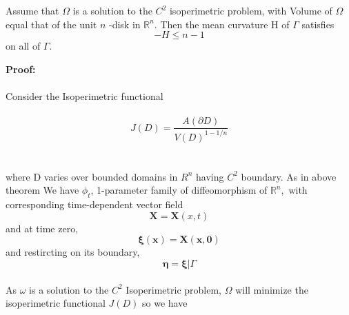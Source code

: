\documentclass[oneside]{book}
\begin{document}
  Assume that $\Omega$ is a solution to the $C^{2}$ isoperimetric problem,
with Volume of $\Omega$ equal that of the unit $n$ -disk in $\mathbb{R}^{n}$. Then the mean curvature
H of $\Gamma$ satisfies
$$
-H \leq n-1
$$
on all of $\Gamma$.

\textbf{Proof:}\\\\
Consider the Isoperimetric functional \\\\
\begin{equation}
J(D)=\frac{A(\partial D)}{V(D)^{1-1 / n}}
 \end{equation}
 \\\\
where D varies over bounded domains in $R^{n}$ having $C^{2}$ boundary.
As in above \\ theorem We have $\phi_{t}$, 1-parameter family of diffeomorphism of $\mathbb{R}^{n},$ with corresponding time-dependent vector field $$\boldsymbol{X} = \boldsymbol{X}(x, t)$$ and at time zero,\\ $$\boldsymbol{\xi}(\boldsymbol{x})=\boldsymbol{X}(\boldsymbol{x}, \boldsymbol{0})$$ and  restircting on its boundary,   \\      $$\boldsymbol{\eta}=\boldsymbol{\xi} | \Gamma $$ \\
As $\omega$ is a solution to the  $C^{2}$ Isoperimetric problem, $\Omega$ will minimize the isoperimetric functional $J(D)$ so we have
\end{document}
